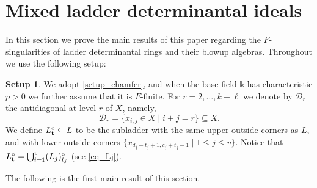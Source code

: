 \documentclass[12pt]{amsart}
\renewcommand{\leq}{\leqslant}
\theoremstyle{definition}
\newtheorem{setup}[setup]{Setup}
\renewcommand{\(}{\left(}
\renewcommand{\)}{\right)}
\newcommand{\ZZ}{\mathbb{Z}}
\newcommand{\kk}{\mathbb{k}}
\newcommand{\Ht}{\operatorname{ht}}
\renewcommand{\!}[1]{{\color{red}\text{\Huge$\star$ }#1}}
\newcommand{\ttt}{{\bf t}}
\begin{document}
\section{Mixed ladder determinantal ideals}\label{MLDSection}


In this section we prove the main results of this paper regarding the $F$-singularities of ladder determinantal rings and their blowup algebras. Throughout we use the following setup:


\begin{setup} \label{setup_mainsec_ladder} 
We adopt \autoref{setup_chamfer}, and when the base field $\kk$ has characteristic $p>0$ we further assume that it is $F$-finite. For  $r=2,\ldots ,k+\ell$ we denote by $\mathcal{D}_r$ the antidiagonal at level $r$ of $X$, namely, 
\[\mathcal{D}_r=\{x_{i,j}\in X\mid i+j=r\}\subseteq X.\]
We define $L^\circ_{\ttt} \subseteq L$ to be the subladder with the same upper-outside corners as $L$, and with lower-outside corners  $\{x_{d_j-t_j+1,c_j+t_j-1} \mid 1 \leq j \leq v\}$. Notice that $L^\circ_{\ttt} =\bigcup_{i=1}^v (L_j)^\circ_{t_j}$ (see \autoref{eq_Lj}).
\end{setup}

The following is the first main result of this section. 
\end{document}
